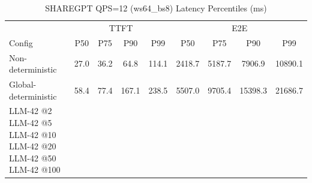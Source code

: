 \begin{table}[htbp]
\centering
\caption{SHAREGPT QPS=12 (ws64_bs8) Latency Percentiles (ms)}
\label{tab:sharegpt_qps12_ws64_bs8}
\begin{tabular}{l|cccc|cccc}
\toprule
& \multicolumn{4}{c|}{TTFT} & \multicolumn{4}{c}{E2E} \\
Config & P50 & P75 & P90 & P99 & P50 & P75 & P90 & P99 \\
\midrule
Non-deterministic & 27.0 & 36.2 & 64.8 & 114.1 & 2418.7 & 5187.7 & 7906.9 & 10890.1 \\
Global-deterministic & 58.4 & 77.4 & 167.1 & 238.5 & 5507.0 & 9705.4 & 15398.3 & 21686.7 \\
LLM-42 @2%
LLM-42 @5%
LLM-42 @10%
LLM-42 @20%
LLM-42 @50%
LLM-42 @100%
\bottomrule
\end{tabular}
\end{table}

